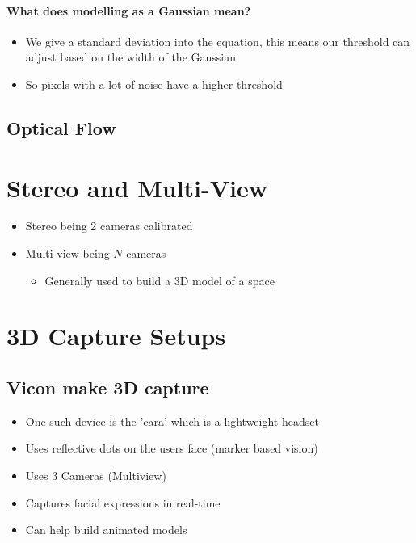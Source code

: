 \documentclass[a4paper]{article}
\begin{document}
\paragraph{What does modelling as a Gaussian mean?}
\label{sec-4-1-4-1}
\begin{itemize}
\item We give a standard deviation into the equation, this means our threshold can adjust based on the width of the Gaussian
\item So pixels with a lot of noise have a higher threshold
\end{itemize}

\subsection{Optical Flow}
\label{sec-4-2}

\section{Stereo and Multi-View}
\label{sec-5}
\begin{itemize}
\item Stereo being 2 cameras calibrated
\item Multi-view being $N$ cameras
\begin{itemize}
\item Generally used to build a 3D model of a space
\end{itemize}
\end{itemize}

\section{3D Capture Setups}
\label{sec-6}
\subsection{Vicon make 3D capture}
\label{sec-6-1}
\begin{itemize}
\item One such device is the 'cara' which is a lightweight headset
\item Uses reflective dots on the users face (marker based vision)
\item Uses 3 Cameras (Multiview)
\item Captures facial expressions in real-time
\item Can help build animated models
\end{itemize}
\end{document}
